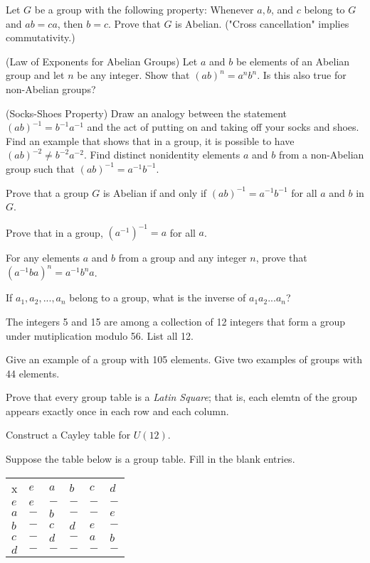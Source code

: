 \documentclass[11pt,largemargins]{homework}
\begin{document}
\question
Let $G$ be a group with the following property: Whenever $a,b$, and $c$ belong to $G$ and $ab=ca$, then $b=c$. 
Prove that $G$ is Abelian. ("Cross cancellation" implies commutativity.)

\question
(Law of Exponents for Abelian Groups) Let $a$ and $b$ be elements of an Abelian group and let $n$ be any integer. Show 
that $(ab)^n=a^nb^n$. Is this also true for non-Abelian groups?

\question
(Socks-Shoes Property) Draw an analogy between the statement $(ab)^{-1}=b^{-1}a^{-1}$ and the act of putting on and taking off 
your socks and shoes. Find an example that shows that in a group, it is possible to have $(ab)^{-2}\neq b^{-2}a^{-2}$. 
Find distinct nonidentity elements $a$ and $b$ from a non-Abelian group such that $(ab)^{-1}=a^{-1}b^{-1}$.

\question
Prove that a group $G$ is Abelian if and only if $(ab)^{-1}=a^{-1}b^{-1}$ for all $a$ and $b$ in $G$.

\question
Prove that in a group, $(a^{-1})^{-1} = a$ for all $a$.

\question
For any elements $a$ and $b$ from a group and any integer $n$, prove that $(a^{-1}ba)^n=a^{-1}b^na$.

\question 
If $a_1,a_2,...,a_n$ belong to a group, what is the inverse of $a_1a_2...a_n$?

\question 
The integers 5 and 15 are among a collection of 12 integers that form a group under mutiplication modulo 56. 
List all 12.

\question 
Give an example of a group with 105 elements. Give two examples of groups with 44 elements.

\question 
Prove that every group table is a \textit{Latin Square}; that is, each elemtn of the group appears exactly once in each row and 
each column. 

\question 
Construct a Cayley table for $U(12)$.

\question 
Suppose the table below is a group table. Fill in the blank entries.

\centering
\begin{tabular}{llllll}
 x  & $e$ & $a$ & $b$ & $c$ & $d$ \\
$e$ & $e$ & $-$ & $-$ & $-$ & $-$ \\
$a$ & $-$ & $b$ & $-$ & $-$ & $e$ \\
$b$ & $-$ & $c$ & $d$ & $e$ & $-$ \\
$c$ & $-$ & $d$ & $-$ & $a$ & $b$ \\
$d$ & $-$ & $-$ & $-$ & $-$ & $-$
\end{tabular}
\end{document}
